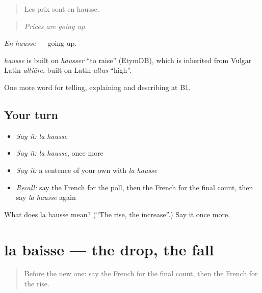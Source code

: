 \begin{quote}
Les prix sont en hausse.
\end{quote}

\begin{quote}
\emph{Prices are going up.}
\end{quote}

\emph{En hausse} — going up.

\begin{cousinweb}
\emph{hausse} is built on \emph{hausser} \textquotedblleft{}to raise\textquotedblright{} (EtymDB), which is inherited from Vulgar Latin \emph{altiāre}, built on Latin \emph{altus} \textquotedblleft{}high\textquotedblright{}.
\end{cousinweb}

\begin{grammarlens}[title={What you've built}]
One more word for telling, explaining and describing at B1.
\end{grammarlens}

\subsection*{Your turn}
\begin{itemize}
\raggedright
  \item \emph{Say it:} \emph{la hausse}
  \item \emph{Say it:} \emph{la hausse}, once more
  \item \emph{Say it:} a sentence of your own with \emph{la hausse}
  \item \emph{Recall:} say the French for the poll, then the French for the final count, then say \emph{la hausse} again
\end{itemize}

\begin{tcolorbox}[breakable,colback=teal!4,colframe=teal!35!black,title={Before you move on}]
What does la hausse mean? (\textquotedblleft{}The rise, the increase\textquotedblright{}.) Say it once more.
\end{tcolorbox}
\section[la baisse]{la baisse — the drop, the fall}

\label{lesson:FR-C286-baisse}



\begin{quote}
Before the new one: say the French for the final count, then the French for the rise.
\end{quote}

